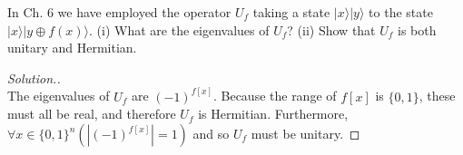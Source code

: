 \documentclass[12pt]{article}
\newenvironment{problem}[2][Problem]{\begin{trivlist}
\item[\hskip \labelsep {\bfseries #1}\hskip \labelsep {\bfseries #2.}]}{\end{trivlist}}
\begin{document}
\begin{problem}{H1}
In Ch. 6 we have employed the operator $U_f$ taking a state $|x\rangle|y\rangle$ to the state $|x\rangle|y\oplus f(x)\rangle$. (i) What are the eigenvalues of $U_f$? (ii) Show that $U_f$ is both unitary and Hermitian.
\end{problem}

\begin{proof}[Solution.]~\\
The eigenvalues of $U_f$ are $(-1)^{f[x]}$. Because the range of $f[x]$ is $\{0,1\}$, these must all be real, and therefore
$U_f$ is Hermitian. Furthermore, $\forall x\in\{0,1\}^n(|(-1)^{f[x]}|=1)$ and so $U_f$ must be unitary.
\end{proof}
\end{document}
